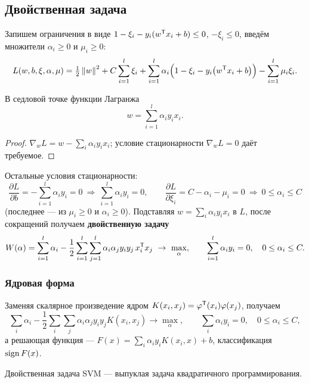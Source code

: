 \subsection{Двойственная задача}

Запишем ограничения в виде $1 - \xi_i - y_i(w^{\mathsf{T}} x_i + b) \le 0$,
$-\xi_i \le 0$, введём множители $\alpha_i \ge 0$ и $\mu_i \ge 0$:
\[
  L(w,b,\xi,\alpha,\mu) = \tfrac12\left\lVert w \right\rVert^2 + C\sum_{i=1}^{l}\xi_i
    + \sum_{i=1}^{l}\alpha_i\Big(1 - \xi_i - y_i\big(w^{\mathsf{T}} x_i + b\big)\Big)
    - \sum_{i=1}^{l}\mu_i \xi_i .
\]

\begin{theorem}\label{thm:svm-w}
В седловой точке функции Лагранжа
\[
  w = \sum_{i=1}^{l}\alpha_i y_i x_i .
\]
\end{theorem}

\begin{proof}
$\nabla_w L = w - \sum_i \alpha_i y_i x_i$; условие стационарности
$\nabla_w L = 0$ даёт требуемое.
\end{proof}

Остальные условия стационарности:
\[
  \frac{\partial L}{\partial b} = -\sum_{i=1}^{l}\alpha_i y_i = 0
  \ \Longrightarrow\ \sum_{i=1}^{l}\alpha_i y_i = 0 ,
  \qquad
  \frac{\partial L}{\partial \xi_i} = C - \alpha_i - \mu_i = 0
  \ \Longrightarrow\ 0 \le \alpha_i \le C
\]
(последнее — из $\mu_i \ge 0$ и $\alpha_i \ge 0$). Подставляя
$w = \sum_i \alpha_i y_i x_i$ в $L$, после сокращений получаем
\textbf{двойственную задачу}
\begin{equation}\label{eq:svm-dual}
  W(\alpha) = \sum_{i=1}^{l}\alpha_i
    - \frac12 \sum_{i=1}^{l}\sum_{j=1}^{l}
      \alpha_i\alpha_j y_i y_j\, x_i^{\mathsf{T}} x_j \ \to\ \max_\alpha ,
  \qquad
  \sum_{i=1}^{l}\alpha_i y_i = 0 , \quad 0 \le \alpha_i \le C .
\end{equation}

\subsubsection*{Ядровая форма}

Заменяя скалярное произведение ядром
$K(x_i,x_j) = \varphi^{\mathsf{T}}(x_i)\varphi(x_j)$, получаем
\[
  \sum_{i}\alpha_i - \frac12\sum_{i}\sum_j \alpha_i\alpha_j y_iy_j K(x_i,x_j)
  \to \max_\alpha ,
  \qquad
  \sum_i \alpha_i y_i = 0 , \quad 0 \le \alpha_i \le C ,
\]
а решающая функция —
$F(x) = \sum_{i}\alpha_i y_i K(x_i, x) + b$, классификация $\operatorname{sign} F(x)$.

\begin{theorem}\label{thm:svm-convex}
Двойственная задача SVM — выпуклая задача квадратичного программирования.
\end{theorem}

